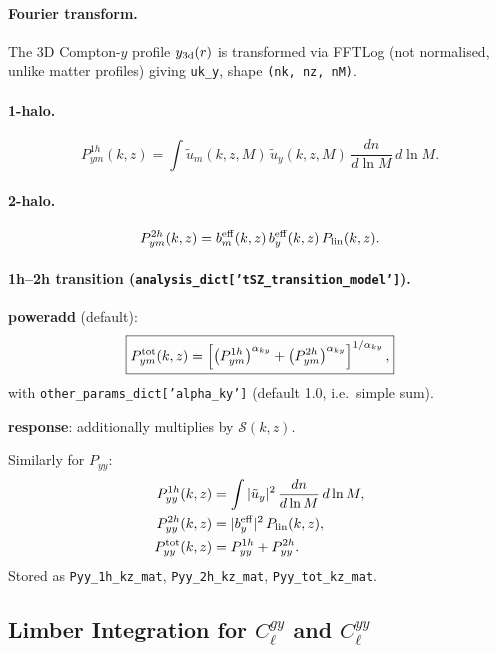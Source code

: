 \documentclass[12pt,a4paper]{article}
\newcommand{\code}[1]{\texttt{\small #1}}
\newcommand{\param}[1]{\texttt{\small #1}}
\begin{document}
\paragraph{Fourier transform.}
The 3D Compton-$y$ profile $y_{\rm 3d}(r)$ is transformed via FFTLog
(not normalised, unlike matter profiles) giving \code{uk\_y}, shape
\code{(nk, nz, nM)}.

\paragraph{1-halo.}
\begin{equation}
  P^{1h}_{ym}(k,z) = \int \tilde u_m(k,z,M)\,\tilde u_y(k,z,M)\,
  \frac{dn}{d\ln M}\,d\ln M.
\end{equation}

\paragraph{2-halo.}
\begin{equation}
  P^{2h}_{ym}(k,z) = b_m^{\rm eff}(k,z)\,b_y^{\rm eff}(k,z)\,P_{\rm lin}(k,z).
\end{equation}

\paragraph{1h--2h transition (\param{analysis\_dict['tSZ\_transition\_model']}).}

\textbf{poweradd} (default):
\begin{equation}
  \boxed{P^{\rm tot}_{ym}(k,z) =
  \left[\left(P^{1h}_{ym}\right)^{\alpha_{ky}} +
  \left(P^{2h}_{ym}\right)^{\alpha_{ky}}\right]^{1/\alpha_{ky}},}
\end{equation}
with \param{other\_params\_dict['alpha\_ky']} (default 1.0, i.e.\ simple sum).

\textbf{response}: additionally multiplies by $\mathcal{S}(k,z)$.

Similarly for $P_{yy}$:
\begin{align}
  P^{1h}_{yy}(k,z) &= \int |\tilde u_y|^2\,\frac{dn}{d\ln M}\,d\ln M, \\
  P^{2h}_{yy}(k,z) &= |b_y^{\rm eff}|^2\,P_{\rm lin}(k,z), \\
  P^{\rm tot}_{yy}(k,z) &= P^{1h}_{yy} + P^{2h}_{yy}.
\end{align}
Stored as \code{Pyy\_1h\_kz\_mat}, \code{Pyy\_2h\_kz\_mat}, \code{Pyy\_tot\_kz\_mat}.

\subsection{Limber Integration for $C_\ell^{gy}$ and $C_\ell^{yy}$}
\label{sec:Cly}
\end{document}
